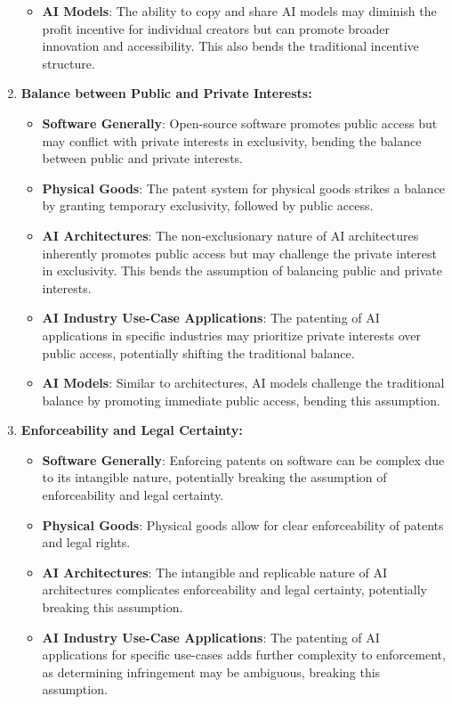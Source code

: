\documentclass{article}[10pt]
\begin{document}
\begin{enumerate}
\begin{itemize}
    	\item \textbf{AI Models}: The ability to copy and share AI models may diminish the profit incentive for individual creators but can promote broader innovation and accessibility. This also bends the traditional incentive structure.
    \end{itemize}
    \item \textbf{Balance between Public and Private Interests:}
    \begin{itemize}
    	\item \textbf{Software Generally}: Open-source software promotes public access but may conflict with private interests in exclusivity, bending the balance between public and private interests.
    	\item \textbf{Physical Goods}: The patent system for physical goods strikes a balance by granting temporary exclusivity, followed by public access.
    	\item \textbf{AI Architectures}: The non-exclusionary nature of AI architectures inherently promotes public access but may challenge the private interest in exclusivity. This bends the assumption of balancing public and private interests.
    	\item \textbf{AI Industry Use-Case Applications}: The patenting of AI applications in specific industries may prioritize private interests over public access, potentially shifting the traditional balance.
    	\item \textbf{AI Models}: Similar to architectures, AI models challenge the traditional balance by promoting immediate public access, bending this assumption.
    \end{itemize}
    \item \textbf{Enforceability and Legal Certainty:}
    \begin{itemize}
    	\item \textbf{Software Generally}: Enforcing patents on software can be complex due to its intangible nature, potentially breaking the assumption of enforceability and legal certainty.
    	\item \textbf{Physical Goods}: Physical goods allow for clear enforceability of patents and legal rights.
    	\item \textbf{AI Architectures}: The intangible and replicable nature of AI architectures complicates enforceability and legal certainty, potentially breaking this assumption.
    	\item \textbf{AI Industry Use-Case Applications}: The patenting of AI applications for specific use-cases adds further complexity to enforcement, as determining infringement may be ambiguous, breaking this assumption.

\end{itemize}
\end{enumerate}
\end{document}
